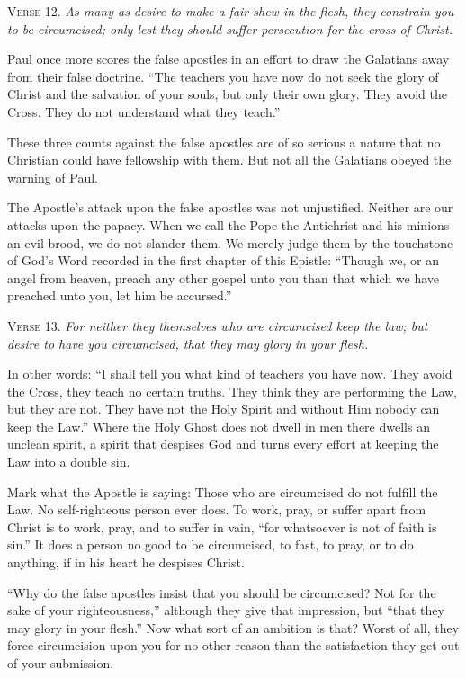 \textsc{Verse} 12. \emph{As many as desire to make a fair shew in the flesh, they constrain you to be circumcised; only lest they should suffer persecution for the cross of Christ.}

Paul once more scores the false apostles in an effort to draw the Galatians away from their false doctrine. “The teachers you have now do not seek the glory of Christ and the salvation of your souls, but only their own glory. They avoid the Cross. They do not understand what they teach.”

These three counts against the false apostles are of so serious a nature that no Christian could have fellowship with them. But not all the Galatians obeyed the warning of Paul.

The Apostle’s attack upon the false apostles was not unjustified. Neither are our attacks upon the papacy. When we call the Pope the Antichrist and his minions an evil brood, we do not slander them. We merely judge them by the touchstone of God’s Word recorded in the first chapter of this Epistle: “Though we, or an angel from heaven, preach any other gospel unto you than that which we have preached unto you, let him be accursed.”

\textsc{Verse} 13. \emph{For neither they themselves who are circumcised keep the law; but desire to have you circumcised, that they may glory in your flesh.}

In other words: “I shall tell you what kind of teachers you have now. They avoid the Cross, they teach no certain truths. They think they are performing the Law, but they are not. They have not the Holy Spirit and without Him nobody can keep the Law.” Where the Holy Ghost does not dwell in men there dwells an unclean spirit, a spirit that despises God and turns every effort at keeping the Law into a double sin.

Mark what the Apostle is saying: Those who are circumcised do not fulfill the Law. No self-righteous person ever does. To work, pray, or suffer apart from Christ is to work, pray, and to suffer in vain, “for whatsoever is not of faith is sin.” It does a person no good to be circumcised, to fast, to pray, or to do anything, if in his heart he despises Christ.

“Why do the false apostles insist that you should be circumcised? Not for the sake of your righteousness,” although they give that impression, but “that they may glory in your flesh.” Now what sort of an ambition is that? Worst of all, they force circumcision upon you for no other reason than the satisfaction they get out of your submission.

